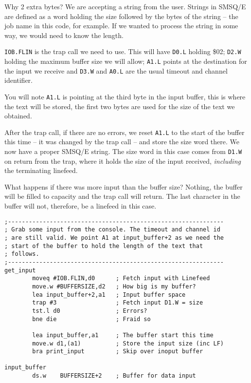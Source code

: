 Why 2 extra bytes? We are accepting a string from the user. Strings
in SMSQ/E are defined as a word holding the size followed by the bytes
of the string -- the job name in this code, for example. If we wanted
to process the string in some way, we would need to know the length.

\texttt{IOB.FLIN} is the trap call we need to use. This will have
\texttt{D0.L} holding \$02; \texttt{D2.W} holding the maximum buffer
size we will allow; \texttt{A1.L} points at the destination for the
input we receive and \texttt{D3.W} and \texttt{A0.L} are the usual
timeout and channel identifier.

You will note \texttt{A1.L} is pointing at the third byte in the input
buffer, this is where the text will be stored, the first two bytes
are used for the size of the text we obtained.

After the trap call, if there are no errors, we reset \texttt{A1.L}
to the start of the buffer this time -- it was changed by the trap
call -- and store the size word there. We now have a proper SMSQ/E
string. The size word in this case comes from \texttt{D1.W} on return
from the trap, where it holds the size of the input received, \emph{including}
the terminating linefeed.

What happens if there was more input than the buffer size? Nothing,
the buffer will be filled to capacity and the trap call will return.
The last character in the buffer will not, therefore, be a linefeed
in this case.

\begin{lstlisting}[caption={Tinyfpga - Request Input},label={lis:Tinyfpga-Request-Input}]
;--------------------------------------------------------------
; Grab some input from the console. The timeout and channel id
; are still valid. We point A1 at input_buffer+2 as we need the
; start of the buffer to hold the length of the text that
; follows.
;--------------------------------------------------------------
get_input
        moveq #IOB.FLIN,d0      ; Fetch input with Linefeed
        move.w #BUFFERSIZE,d2   ; How big is my buffer?
        lea input_buffer+2,a1   ; Input buffer space
        trap #3                 ; Fetch input D1.W = size
        tst.l d0                ; Errors?
        bne die                 ; Fraid so

        lea input_buffer,a1     ; The buffer start this time
        move.w d1,(a1)          ; Store the input size (inc LF)
        bra print_input         ; Skip over inoput buffer

input_buffer
        ds.w    BUFFERSIZE+2    ; Buffer for data input

\end{lstlisting}

